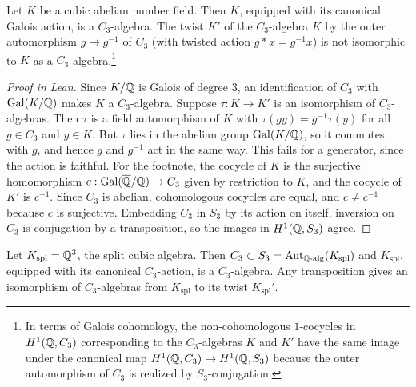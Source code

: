 \begin{example}

\label{example:twoRationalPointsSamePoly}


\leanok



 Let $K$ be a cubic abelian number field. Then $K$, equipped with its canonical Galois action, is a $C_3$-algebra. The twist $K'$ of the $C_3$-algebra $K$ by the outer automorphism $g \mapsto g^{-1}$ of $C_3$ (with twisted action $g \ast x = g^{-1}x$) is not isomorphic to $K$ as a $C_3$-algebra.\footnote{ In terms of Galois cohomology, the non-cohomologous $1$-cocycles in $H^1(\mathbb{Q},C_3)$ corresponding to the $C_3$-algebras $K$ and $K'$ have the same image under the canonical map $H^1(\mathbb{Q},C_3) \to H^1(\mathbb{Q},S_3)$ because the outer automorphism of $C_3$ is realized by $S_3$-conjugation.} 

\end{example}

\begin{proof}[Proof in Lean]

\leanok

Since $K/\mathbb{Q}$ is Galois of degree $3$, an identification of $C_3$ with $\mathrm{Gal}(K/\mathbb{Q})$ makes $K$ a $C_3$-algebra. Suppose $\tau:K\to K'$ is an isomorphism of $C_3$-algebras. Then $\tau$ is a field automorphism of $K$ with $\tau(gy)=g^{-1}\tau(y)$ for all $g\in C_3$ and $y\in K$. But $\tau$ lies in the abelian group $\mathrm{Gal}(K/\mathbb{Q})$, so it commutes with $g$, and hence $g$ and $g^{-1}$ act in the same way. This fails for a generator, since the action is faithful. For the footnote, the cocycle of $K$ is the surjective homomorphism $c:\mathrm{Gal}(\overline{\mathbb{Q}}/\mathbb{Q})\to C_3$ given by restriction to $K$, and the cocycle of $K'$ is $c^{-1}$. Since $C_3$ is abelian, cohomologous cocycles are equal, and $c\neq c^{-1}$ because $c$ is surjective. Embedding $C_3$ in $S_3$ by its action on itself, inversion on $C_3$ is conjugation by a transposition, so the images in $H^1(\mathbb{Q},S_3)$ agree.

\end{proof}

\begin{example}

\label{example:splitAlgebra}


\leanok



 Let $K_{\text{spl}} = \mathbb{Q}^3$, the split cubic algebra. Then $C_3\subset S_3 = \mathrm{Aut}_{\mathbb{Q}\text{-alg}}(K_{\text{spl}})$ and $K_{\text{spl}}$, equipped with its canonical $C_3$-action, is a $C_3$-algebra. Any transposition gives an isomorphism of $C_3$-algebras from $K_{\text{spl}}$ to its twist $K_{\text{spl}}'$. 

\end{example}

